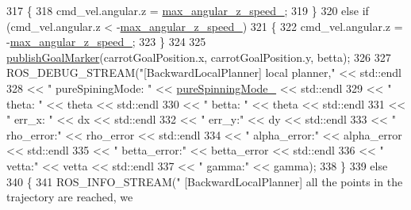 \begin{DoxyCode}
{317                 \{
318                     cmd\_vel.angular.z = \hyperlink{classcl__move__base__z_1_1backward__local__planner_1_1BackwardLocalPlanner_af7e492339ee2d1c90c00f6dd4cf95551}{max\_angular\_z\_speed\_};
319                 \}
320                 \textcolor{keywordflow}{else} \textcolor{keywordflow}{if} (cmd\_vel.angular.z < -\hyperlink{classcl__move__base__z_1_1backward__local__planner_1_1BackwardLocalPlanner_af7e492339ee2d1c90c00f6dd4cf95551}{max\_angular\_z\_speed\_})
321                 \{
322                     cmd\_vel.angular.z = -\hyperlink{classcl__move__base__z_1_1backward__local__planner_1_1BackwardLocalPlanner_af7e492339ee2d1c90c00f6dd4cf95551}{max\_angular\_z\_speed\_};
323                 \}
324 
325                 \hyperlink{classcl__move__base__z_1_1backward__local__planner_1_1BackwardLocalPlanner_a70eaeb6cf31fd3378d9fbf9bcb975995}{publishGoalMarker}(carrotGoalPosition.x, carrotGoalPosition.y, betta);
326 
327                 ROS\_DEBUG\_STREAM(\textcolor{stringliteral}{"[BackwardLocalPlanner] local planner,"} << std::endl
328                                                 << \textcolor{stringliteral}{" pureSpiningMode: "} << 
      \hyperlink{classcl__move__base__z_1_1backward__local__planner_1_1BackwardLocalPlanner_aebc89ccfa79fdf6bd45ba35134bec3fb}{pureSpinningMode\_} << std::endl
329                                                 << \textcolor{stringliteral}{" theta: "} << theta << std::endl
330                                                 << \textcolor{stringliteral}{" betta: "} << theta << std::endl
331                                                 << \textcolor{stringliteral}{" err\_x: "} << dx << std::endl
332                                                 << \textcolor{stringliteral}{" err\_y:"} << dy << std::endl
333                                                 << \textcolor{stringliteral}{" rho\_error:"} << rho\_error << std::endl
334                                                 << \textcolor{stringliteral}{" alpha\_error:"} << alpha\_error << std::endl
335                                                 << \textcolor{stringliteral}{" betta\_error:"} << betta\_error << std::endl
336                                                 << \textcolor{stringliteral}{" vetta:"} << vetta << std::endl
337                                                 << \textcolor{stringliteral}{" gamma:"} << gamma);
338             \}
339             \textcolor{keywordflow}{else}
340             \{
341                 ROS\_INFO\_STREAM(\textcolor{stringliteral}{" [BackwardLocalPlanner] all the points in the trajectory are reached, we
}}
\end{DoxyCode}
